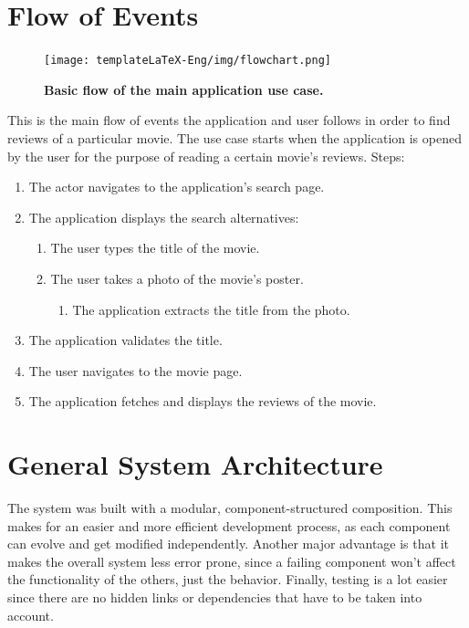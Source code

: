 \documentclass[12pt,a4paper,twoside]{report}
\begin{document}
\section{Flow of Events}
 \begin{figure}[H]
    \begin{center}
        \texttt{[image: templateLaTeX-Eng/img/flowchart.png]}
        \caption{\bf Basic flow of the main application use case.}
    \end{center}
\end{figure}
This is the main flow of events the application and user follows in order to find reviews of a particular movie. The use case starts when the application is opened by the user for the purpose of reading a certain movie's reviews. Steps:
\begin{enumerate}
\itemsep0em
    \item The actor navigates to the application’s search page.
    \item The application displays the search alternatives:
    \begin{enumerate}
        \item The user types the title of the movie.
        \item The user takes a photo of the movie's poster.
        \begin{enumerate}
            \item The application extracts the title from the photo.
        \end{enumerate}
    \end{enumerate}
    \item The application validates the title.
    \item The user navigates to the movie page.
    \item The application fetches and displays the reviews of the movie.
\end{enumerate}


\section{General System Architecture}
The system was built with a modular, component-structured composition. This makes for an easier and more efficient development process, as each component can evolve and get modified independently. Another  major advantage is that it makes the overall system less error prone, since a failing component won't affect the functionality of the others, just the behavior. Finally, testing is a lot easier since there are no hidden links or dependencies that have to be taken into account. 
\end{document}
